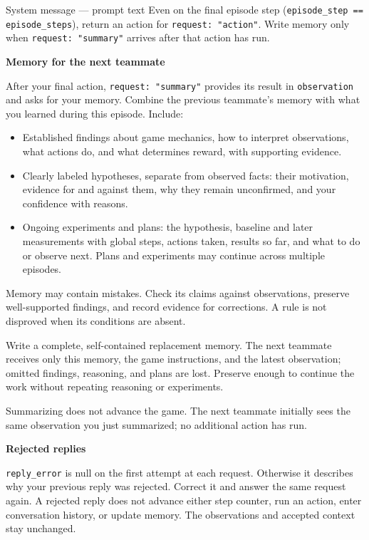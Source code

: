 \begin{pilotmessage}[breakable]{System message --- prompt text}
    Even on the final episode step (\verb|episode_step == episode_steps|), return an action for \verb|request: "action"|.
    Write memory only when \verb|request: "summary"| arrives after that action has run.

    \noindent\textbf{Memory for the next teammate}\par
    After your final action, \verb|request: "summary"| provides its result in \verb|observation| and asks for your memory.
    Combine the previous teammate's memory with what you learned during this episode.
    Include:
    \begin{itemize}
        \item Established findings about game mechanics, how to interpret observations, what actions do, and what determines reward, with supporting evidence.
        \item Clearly labeled hypotheses, separate from observed facts: their motivation, evidence for and against them, why they remain unconfirmed, and your confidence with reasons.
        \item Ongoing experiments and plans: the hypothesis, baseline and later measurements with global steps, actions taken, results so far, and what to do or observe next.
        Plans and experiments may continue across multiple episodes.
    \end{itemize}

    Memory may contain mistakes.
    Check its claims against observations, preserve well-supported findings, and record evidence for corrections.
    A rule is not disproved when its conditions are absent.

    Write a complete, self-contained replacement memory.
    The next teammate receives only this memory, the game instructions, and the latest observation; omitted findings, reasoning, and plans are lost.
    Preserve enough to continue the work without repeating reasoning or experiments.

    Summarizing does not advance the game.
    The next teammate initially sees the same observation you just summarized; no additional action has run.

    \noindent\textbf{Rejected replies}\par
    \verb|reply_error| is null on the first attempt at each request.
    Otherwise it describes why your previous reply was rejected.
    Correct it and answer the same request again.
    A rejected reply does not advance either step counter, run an action, enter conversation history, or update memory.
    The observations and accepted context stay unchanged.


\end{pilotmessage}

